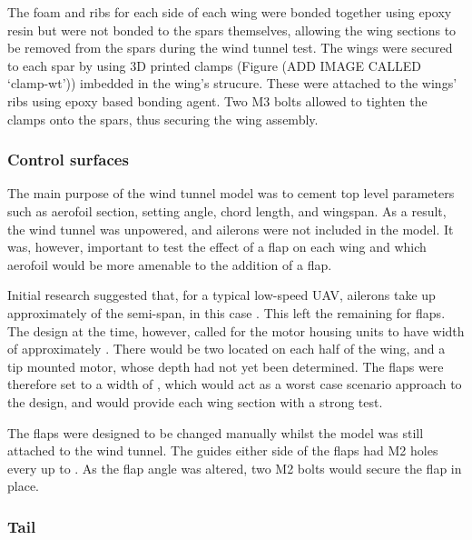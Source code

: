 \documentclass[../../main.tex]{subfiles}
\begin{document}
The foam and ribs for each side of each wing were bonded together using epoxy resin but were not bonded to the spars themselves, allowing the wing sections to be removed from the spars during the wind tunnel test. 
The wings were secured to each spar by using 3D printed clamps (Figure (ADD IMAGE CALLED `clamp-wt')) imbedded in the wing's strucure.
These were attached to the wings' ribs using epoxy based bonding agent.
Two M3 bolts allowed to tighten the clamps onto the spars, thus securing the wing assembly.


\subsubsection{Control surfaces} \label{sec:design-process:interim-design-review:wind-tunnel-test:control-surfaces}

The main purpose of the wind tunnel model was to cement top level parameters such as aerofoil section, setting angle, chord length, and wingspan.
As a result, the wind tunnel was unpowered, and ailerons were not included in the model.
It was, however, important to test the effect of a flap on each wing and which aerofoil would be more amenable to the addition of a flap. 

Initial research suggested that, for a typical low-speed UAV, ailerons take up approximately  of the semi-span, in this case  \cite{sadraey-13}.
This left the remaining  for flaps.
The design at the time, however, called for the motor housing units to have width of approximately .
There would be two located on each half of the wing, and a tip mounted motor, whose depth had not yet been determined.
The flaps were therefore set to a width of , which would act as a worst case scenario approach to the design, and would provide each wing section with a strong test.

The flaps were designed to be changed manually whilst the model was still attached to the wind tunnel.
The guides either side of the flaps had M2 holes every  up to .
As the flap angle was altered, two M2 bolts would secure the flap in place. 


\subsubsection{Tail} \label{sec:design-process:interim-design-review:wind-tunnel-test:tail}
\end{document}
